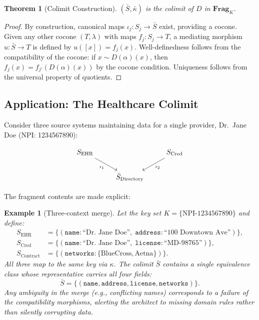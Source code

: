 \documentclass[11pt,a4paper]{article}
\newtheorem{theorem}[definition]{Theorem}
\newtheorem{example}[definition]{Example}
\begin{document}
\begin{theorem}[Colimit Construction]
\label{thm:colimit}
$(\bar{S},\bar{\kappa})$ is the colimit of $D$ in $\mathbf{Frag}_K$.
\end{theorem}

\begin{proof}
By construction, canonical maps $\iota_j:S_j\to\bar{S}$ exist,
providing a cocone. Given any other cocone $(T,\lambda)$ with maps
$f_j:S_j\to T$, a mediating morphism $u:\bar{S}\to T$ is defined by
$u([x])=f_j(x)$. Well-definedness follows from the compatibility of
the cocone: if $x\sim D(\alpha)(x)$, then
$f_j(x)=f_{j'}(D(\alpha)(x))$ by the cocone condition. Uniqueness
follows from the universal property of quotients.
\end{proof}

\subsection{Application: The Healthcare Colimit}
\label{sec:healthcare-colimit}

Consider three source systems maintaining data for a single provider,
Dr.~Jane Doe (NPI: 1234567890):

\[
\begin{tikzcd}
  S_{\text{EHR}} \ar[dr, "\iota_1"'] & & S_{\text{Cred}} \ar[dl, "\iota_2"] \\
  & \bar{S}_{\text{Directory}} &
\end{tikzcd}
\]

\noindent
The fragment contents are made explicit:

\begin{example}[Three-context merge]
\label{ex:three-context}
Let the key set $K=\{\text{NPI-1234567890}\}$ and define:
\begin{align*}
  S_{\text{EHR}} &= \{(\texttt{name}: \text{``Dr.~Jane Doe''},\;
    \texttt{address}: \text{``100 Downtown Ave''})\}, \\
  S_{\text{Cred}} &= \{(\texttt{name}: \text{``Dr.~Jane Doe''},\;
    \texttt{license}: \text{``MD-98765''})\}, \\
  S_{\text{Contract}} &= \{(\texttt{networks}:
    \{\text{BlueCross},\text{Aetna}\})\}.
\end{align*}
All three map to the same key via $\kappa$. The colimit
$\bar{S}$ contains a single equivalence class whose representative
carries all four fields:
\[
  \bar{S} = \{(\texttt{name}, \texttt{address}, \texttt{license},
    \texttt{networks})\}.
\]
Any ambiguity in the merge (e.g., conflicting names) corresponds to a
failure of the compatibility morphisms, alerting the architect to
missing domain rules rather than silently corrupting data.
\end{example}
\end{document}
